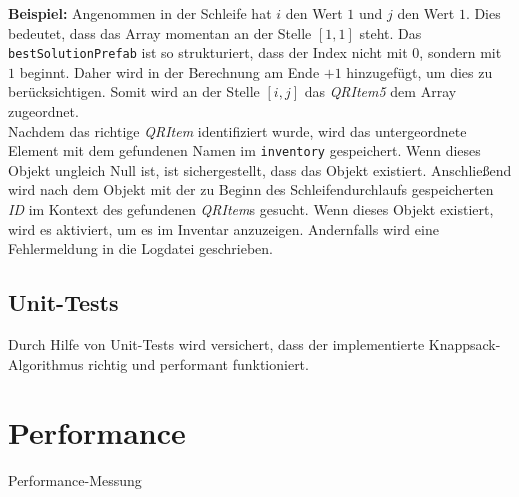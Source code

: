 \textbf{Beispiel:}
Angenommen in der Schleife hat $i$ den Wert $1$ und $j$ den Wert $1$. Dies bedeutet, dass das Array momentan an der Stelle $[1, 1]$
steht. Das \texttt{bestSolutionPrefab} ist so strukturiert, dass der Index nicht mit $0$, sondern mit $1$ beginnt. Daher
wird in der Berechnung am Ende $+ 1$ hinzugefügt, um dies zu berücksichtigen. Somit wird an der Stelle $[i, j]$ das
\textit{QRItem5} dem Array zugeordnet.\\

Nachdem das richtige \textit{QRItem} identifiziert wurde, wird das untergeordnete Element mit dem gefundenen Namen im
\texttt{inventory} gespeichert. Wenn dieses Objekt ungleich Null ist, ist sichergestellt, dass das Objekt existiert.
Anschließend wird nach dem Objekt mit der zu Beginn des Schleifendurchlaufs gespeicherten \textit{ID} im Kontext des
gefundenen \textit{QRItem}s gesucht. Wenn dieses Objekt existiert, wird es aktiviert, um es im Inventar anzuzeigen.
Andernfalls wird eine Fehlermeldung in die Logdatei geschrieben.

\subsection{Unit-Tests}
Durch Hilfe von Unit-Tests wird versichert, dass der implementierte Knappsack-Algorithmus
richtig und performant funktioniert.

\section{Performance}
Performance-Messung
